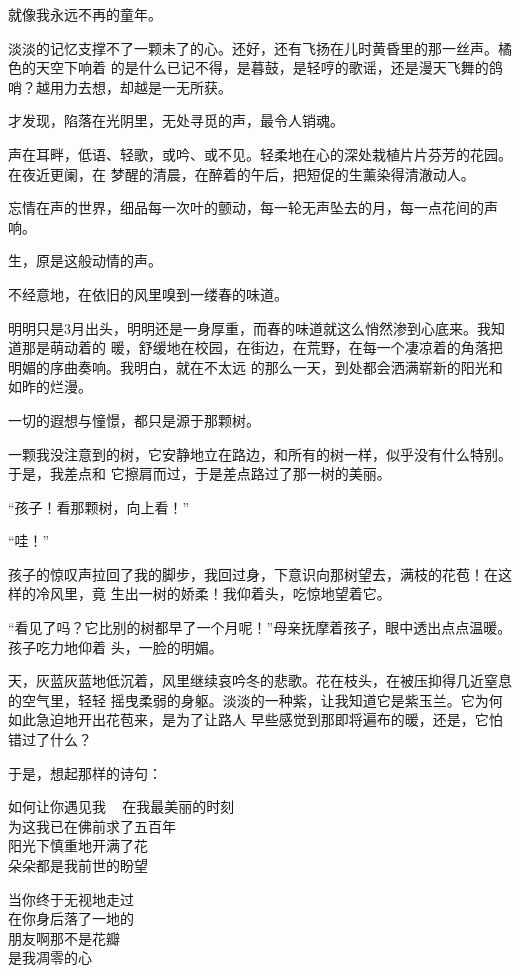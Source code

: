 \documentclass[12pt,a4paper]{article}
\begin{document}
		就像我永远不再的童年。

		淡淡的记忆支撑不了一颗未了的心。还好，还有飞扬在儿时黄昏里的那一丝声。橘色的天空下响着
	的是什么已记不得，是暮鼓，是轻哼的歌谣，还是漫天飞舞的鸽哨？越用力去想，却越是一无所获。

		才发现，陷落在光阴里，无处寻觅的声，最令人销魂。

		声在耳畔，低语、轻歌，或吟、或不见。轻柔地在心的深处栽植片片芬芳的花园。在夜近更阑，在
	梦醒的清晨，在醉着的午后，把短促的生薰染得清澈动人。

		忘情在声的世界，细品每一次叶的颤动，每一轮无声坠去的月，每一点花间的声响。

		生，原是这般动情的声。

	\endwriting



		不经意地，在依旧的风里嗅到一缕春的味道。

		明明只是3月出头，明明还是一身厚重，而春的味道就这么悄然渗到心底来。我知道那是萌动着的
	暖，舒缓地在校园，在街边，在荒野，在每一个凄凉着的角落把明媚的序曲奏响。我明白，就在不太远
	的那么一天，到处都会洒满崭新的阳光和如昨的烂漫。

		一切的遐想与憧憬，都只是源于那颗树。

		一颗我没注意到的树，它安静地立在路边，和所有的树一样，似乎没有什么特别。于是，我差点和
	它擦肩而过，于是差点路过了那一树的美丽。

		“孩子！看那颗树，向上看！”

		“哇！”

		孩子的惊叹声拉回了我的脚步，我回过身，下意识向那树望去，满枝的花苞！在这样的冷风里，竟
	生出一树的娇柔！我仰着头，吃惊地望着它。

		“看见了吗？它比别的树都早了一个月呢！”母亲抚摩着孩子，眼中透出点点温暖。孩子吃力地仰着
	头，一脸的明媚。

		天，灰蓝灰蓝地低沉着，风里继续哀吟冬的悲歌。花在枝头，在被压抑得几近窒息的空气里，轻轻
	摇曳柔弱的身躯。淡淡的一种紫，让我知道它是紫玉兰。它为何如此急迫地开出花苞来，是为了让路人
	早些感觉到那即将遍布的暖，还是，它怕错过了什么？

		于是，想起那样的诗句：

		\longpoem{}{}{}
		如何让你遇见我 ~ 在我最美丽的时刻 \\
		为这我已在佛前求了五百年 \\
		阳光下慎重地开满了花 \\
		朵朵都是我前世的盼望

		当你终于无视地走过 \\
		在你身后落了一地的 \\
		朋友啊那不是花瓣 \\
		是我凋零的心
		\endlongpoem
\end{document}
